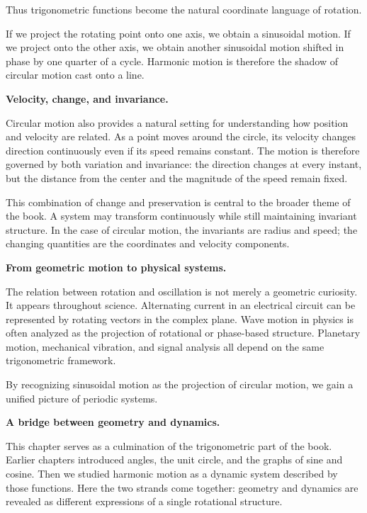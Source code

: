 \documentclass[11pt, openany]{book}
\theoremstyle{plain}
\theoremstyle{definition}
\theoremstyle{remark}
\begin{document}
Thus trigonometric functions become the natural coordinate language of
rotation.

If we project the rotating point onto one axis, we obtain a sinusoidal
motion. If we project onto the other axis, we obtain another sinusoidal
motion shifted in phase by one quarter of a cycle. Harmonic motion is
therefore the shadow of circular motion cast onto a line.

\medskip

\textbf{Velocity, change, and invariance.}

Circular motion also provides a natural setting for understanding how
position and velocity are related. As a point moves around the circle,
its velocity changes direction continuously even if its speed remains
constant. The motion is therefore governed by both variation and
invariance: the direction changes at every instant, but the distance
from the center and the magnitude of the speed remain fixed.

This combination of change and preservation is central to the broader
theme of the book. A system may transform continuously while still
maintaining invariant structure. In the case of circular motion, the
invariants are radius and speed; the changing quantities are the
coordinates and velocity components.

\medskip

\textbf{From geometric motion to physical systems.}

The relation between rotation and oscillation is not merely a geometric
curiosity. It appears throughout science. Alternating current in an
electrical circuit can be represented by rotating vectors in the complex
plane. Wave motion in physics is often analyzed as the projection of
rotational or phase-based structure. Planetary motion, mechanical
vibration, and signal analysis all depend on the same trigonometric
framework.

By recognizing sinusoidal motion as the projection of circular motion,
we gain a unified picture of periodic systems.

\medskip

\textbf{A bridge between geometry and dynamics.}

This chapter serves as a culmination of the trigonometric part of the
book. Earlier chapters introduced angles, the unit circle, and the
graphs of sine and cosine. Then we studied harmonic motion as a dynamic
system described by those functions. Here the two strands come together:
geometry and dynamics are revealed as different expressions of a single
rotational structure.
\end{document}
